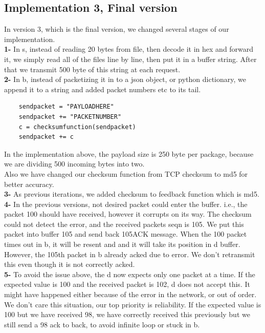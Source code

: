 \documentclass[12pt,journal,compsoc]{IEEEtran}
\begin{document}
\subsection{Implementation 3, Final version}
In version 3, which is the final version, we changed several stages of our implementation.\\
\textbf{1-} In s, instead of reading 20 bytes from file, then decode it in hex and forward it, we simply read all of the files line by line, then put it in a buffer string. After that we transmit 500 byte of this string at each request.\\
\textbf{2-} In b, instead of packetizing it in to a json object, or python dictionary, we append it to a string and added packet numbers etc to its tail.\\
\begin{verbatim}
	sendpacket = "PAYLOADHERE"
	sendpacket += "PACKETNUMBER"
	c = checksumfunction(sendpacket)
	sendpacket += c
\end{verbatim}
In the implementation above, the payload size is 250 byte per package, because we are dividing 500 incoming bytes into two.\\
Also we have changed our checksum function from TCP checksum to md5 for better accuracy.\\
\textbf{3-} As previous iterations, we added checksum to feedback function which is md5.\\
\textbf{4-} In the previous versions, not desired packet could enter the buffer. i.e., the packet 100 should have received, however it corrupts on its way. The checksum could not detect the error, and the received packets seqn is 105. We put this packet into buffer 105 and send back 105ACK message. When the 100 packet times out in b, it will be resent and and it will take its position in d buffer. However, the 105th packet in b already acked due to error. We don't retransmit this even though it is not correctly acked.\\
\textbf{5-} To avoid the issue above, the d now expects only one packet at a time. If the expected value is 100 and the received packet is 102, d does not accept this. It might have happened either because of the error in the network, or out of order. We don't care this situation, our top priority is reliability. If the expected value is 100 but we have received 98, we have correctly received this previously but we still send a 98 ack to back, to avoid infinite loop or stuck in b.\\
\end{document}
